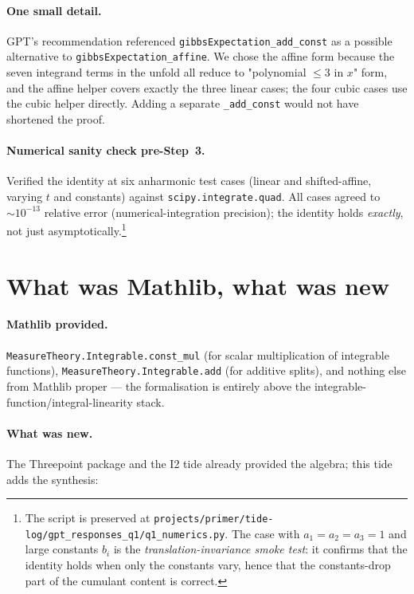 \documentclass[11pt]{article}
\begin{document}
\paragraph{One small detail.} GPT's recommendation referenced
\texttt{gibbsExpectation\_add\_const} as a possible alternative to
\texttt{gibbsExpectation\_affine}. We chose the affine form because
the seven integrand terms in the unfold all reduce to "polynomial
$\le 3$ in $x$" form, and the affine helper covers exactly the three
linear cases; the four cubic cases use the cubic helper directly.
Adding a separate \texttt{\_add\_const} would not have shortened the
proof.

\paragraph{Numerical sanity check pre-Step~3.} Verified the identity
at six anharmonic test cases (linear and shifted-affine, varying $t$
and constants) against \texttt{scipy.integrate.quad}. All cases
agreed to $\sim10^{-13}$ relative error (numerical-integration
precision); the identity holds \emph{exactly}, not just
asymptotically.\footnote{The script is preserved at
\texttt{projects/primer/tide-log/gpt\_responses\_q1/q1\_numerics.py}.
The case with $a_1 = a_2 = a_3 = 1$ and large constants $b_i$ is the
\emph{translation-invariance smoke test}: it confirms that the
identity holds when only the constants vary, hence that the
constants-drop part of the cumulant content is correct.}

\section{What was Mathlib, what was new}

\paragraph{Mathlib provided.}
\texttt{MeasureTheory.Integrable.const\_mul} (for scalar
multiplication of integrable functions),
\texttt{MeasureTheory.Integrable.add} (for additive splits), and
nothing else from Mathlib proper — the formalisation is entirely
above the integrable-function/integral-linearity stack.

\paragraph{What was new.} The Threepoint package and the I2 tide
already provided the algebra; this tide adds the synthesis:
\end{document}
